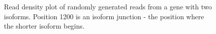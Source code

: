 \begin{figure}
    \begin{center}
        
    \end{center}
    \caption{Read density plot of randomly generated reads from a gene with two isoforms. Position 1200 is an isoform junction - the position where the shorter isoform begins.}
    \label{twoisoform}
\end{figure}
